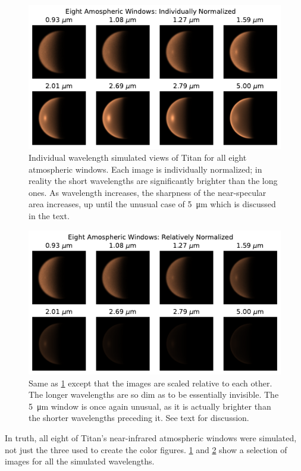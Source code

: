 \documentclass[linenumbers]{aastex631}
\begin{document}
\begin{figure}[htbp]
\includegraphics[scale = 0.7]{8WindowsNorm.pdf}
\centering
\caption{Individual wavelength simulated views of Titan for all eight atmospheric windows. Each image is individually normalized; in reality the short wavelengths are significantly brighter than the long ones. As wavelength increases, the sharpness of the near-specular area increases, up until the unusual case of \qty{5}{\micro\meter} which is discussed in the text.}
\label{fig:7}
\end{figure}
\begin{figure}[htbp]
\includegraphics[scale = 0.7]{8WindowsNoNorm.pdf}
\centering
\caption{Same as \ref{fig:7} except that the images are scaled relative to each other. The longer wavelengths are so dim as to be essentially invisible. The \qty{5}{\micro\meter} window is once again unusual, as it is actually brighter than the shorter wavelengths preceding it. See text for discussion.}
\label{fig:8}
\end{figure}

In truth, all eight of Titan's near-infrared atmospheric windows were simulated, not just the three used to create the color figures. \ref{fig:7} and \ref{fig:8} show a selection of images for all the simulated wavelengths.
\end{document}
